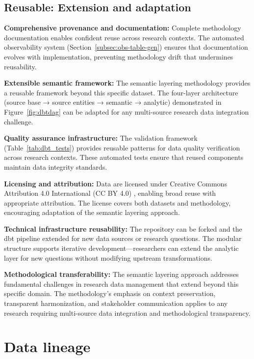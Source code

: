 \documentclass{article}
\begin{document}
\subsection{Reusable: Extension and adaptation}

\textbf{Comprehensive provenance and documentation:} Complete methodology documentation enables confident reuse across research contexts. The automated observability system (Section~\ref{subsec:obs-table-gen}) ensures that documentation evolves with implementation, preventing methodology drift that undermines reusability.

\textbf{Extensible semantic framework:} The semantic layering methodology provides a reusable framework beyond this specific dataset. The four-layer architecture (source base → source entities → semantic → analytic) demonstrated in Figure~\ref{fig:dbtdag} can be adapted for any multi-source research data integration challenge.

\textbf{Quality assurance infrastructure:} The validation framework (Table~\ref{tab:dbt_tests}) provides reusable patterns for data quality verification across research contexts. These automated tests ensure that reused components maintain data integrity standards.

\textbf{Licensing and attribution:} Data are licensed under Creative Commons Attribution 4.0 International (CC BY 4.0) \cite{creative_commons}, enabling broad reuse with appropriate attribution. The license covers both datasets and methodology, encouraging adaptation of the semantic layering approach.

\textbf{Technical infrastructure reusability:} The repository can be forked and the dbt pipeline extended for new data sources or research questions. The modular structure supports iterative development—researchers can extend the analytic layer for new questions without modifying upstream transformations.

\textbf{Methodological transferability:} The semantic layering approach addresses fundamental challenges in research data management that extend beyond this specific domain. The methodology's emphasis on context preservation, transparent harmonization, and stakeholder communication applies to any research requiring multi-source data integration and methodological transparency.

\section{Data lineage}
\label{sec:data-lineage}
\end{document}
